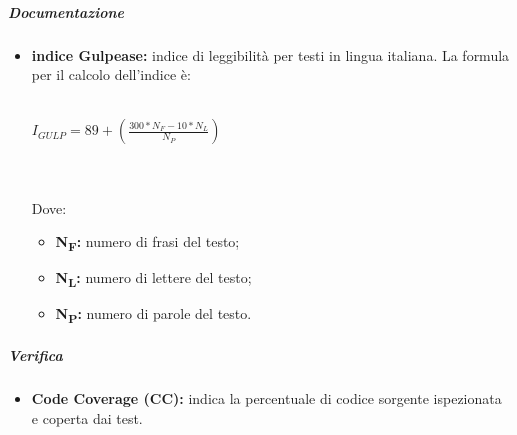 \subparagraph*{Documentazione}
\begin{itemize}
	\item \textbf{indice Gulpease:} indice di leggibilità per testi in lingua italiana. La formula per il calcolo dell'indice è:\\\\
	\centerline{
		\begin{math}
		I_{GULP}=89+(\frac{300*N_F-10*N_L}{N_P})
		\end{math}
	}
	\\\\Dove:
	\begin{itemize}
		\item \textbf{N\textsubscript{F}:} numero di frasi del testo;
		\item \textbf{N\textsubscript{L}:} numero di lettere del testo;
		\item \textbf{N\textsubscript{P}:} numero di parole del testo.
	\end{itemize}
\end{itemize}

\subparagraph*{Verifica}
\begin{itemize}
	\item \textbf{Code Coverage (CC):} indica la percentuale di codice sorgente ispezionata e coperta dai test.
\end{itemize}

